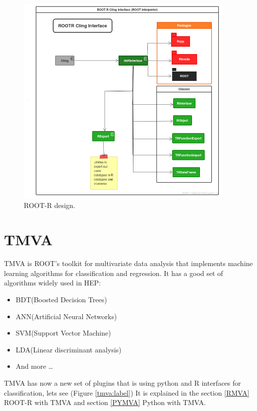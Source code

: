 \documentclass[a4paper]{jpconf}
\begin{document}
\begin{figure}[h]
\centering
\includegraphics[width=25pc]{img/rootr.png}\caption{\label{rootr:label} ROOT-R design.}
\end{figure}


\section{TMVA}
TMVA \cite{Hocker:2007ht} is ROOT's toolkit for multivariate data analysis
that implements machine learning algorithms for
classification and regression.
It has a good set of algorithms widely used in HEP:
\begin{itemize}  
\item BDT(Boosted Decision Trees)
\item ANN(Artificial Neural Networks)
\item SVM(Support Vector Machine)
\item LDA(Linear discriminant analysis)
\item And more \ldots 
\end{itemize}
TMVA has now a new set of plugins that is using python and R interfaces for classification, lets see (Figure \ref{tmva:label})
It is explained in the  section \ref{RMVA} ROOT-R with TMVA and section \ref{PYMVA} Python with TMVA.
\end{document}
